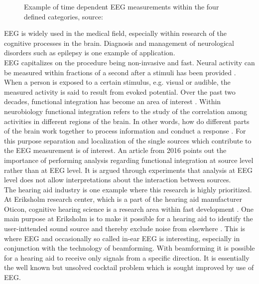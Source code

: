\begin{figure}[H]
\begin{minipage}[t]{.45\textwidth}
        \caption{Example of time dependent EEG measurements within the four defined categories, source: \cite{EEGsignalprocessing}}\label{fig:EEG_example}
    \end{minipage}
\end{figure}
\noindent
EEG is widely used in the medical field, especially within research of the cognitive processes in the brain. 
Diagnosis and management of neurological disorders such as epilepsy is one example of application.
\\
EEG capitalizes on the procedure being non-invasive and fast.
Neural activity can be measured within fractions of a second after a stimuli has been provided \cite[p. 3]{fundamentalEEG}. 
When a person is exposed to a certain stimulus, e.g. visual or audible, the measured activity is said to result from evoked potential.
Over the past two decades, functional integration has become an area of interest \cite{Friston2011}. 
Within neurobiology functional integration refers to the study of the correlation among activities in different regions of the brain. 
In other words, how do different parts of the brain work together to process information and conduct a response \cite{Friston2002}.     
For this purpose separation and localization of the single sources which contribute to the EEG measurement is of interest. 
An article from 2016 \cite{Van2019} points out the importance of performing analysis regarding functional integration at source level rather than at EEG level. 
It is argued through experiments that analysis at EEG level does not allow interpretations about the interaction between sources.  
\\ 
The hearing aid industry is one example where this research is highly prioritized. 
At Eriksholm research center, which is a part of the hearing aid manufacturer Oticon, cognitive hearing science is a research area within fast development \cite{Weberik}. 
One main purpose at Eriksholm is to make it possible for a hearing aid to identify the user-inttended sound source and thereby exclude noise from elsewhere \cite{Emina2019} \cite{Bech2018}. 
This is where EEG and occasionally so called in-ear EEG is interesting, especially in conjunction with the technology of beamforming. With beamforming it is possible for a hearing aid to receive only signals from a specific direction. 
It is essentially the well known but unsolved cocktail problem which is sought improved by use of EEG. 



